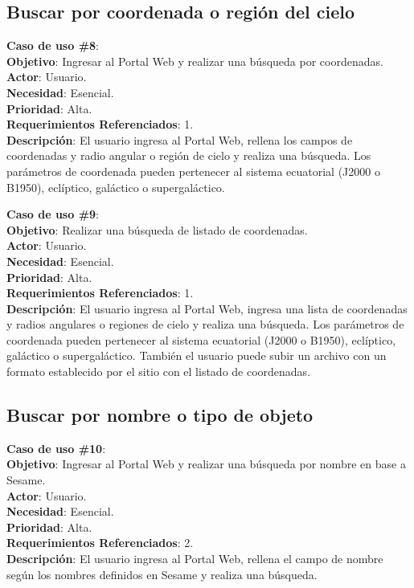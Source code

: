 \subsection{Buscar por coordenada o región del cielo}
\noindent\textbf{Caso de uso \#8}: \\
\textbf{Objetivo}: Ingresar al Portal Web y realizar una búsqueda por coordenadas. \\
\textbf{Actor}: Usuario. \\
\textbf{Necesidad}: Esencial. \\
\textbf{Prioridad}: Alta. \\
\textbf{Requerimientos Referenciados}: 1. \\
\textbf{Descripción}: El usuario ingresa al Portal Web, rellena los campos de coordenadas y radio angular o región de cielo y realiza una búsqueda. Los parámetros de coordenada pueden pertenecer al sistema ecuatorial (J2000 o B1950), eclíptico, galáctico o supergaláctico.
\vspace{1.0cm}

\noindent\textbf{Caso de uso \#9}: \\
\textbf{Objetivo}: Realizar una búsqueda de listado de coordenadas. \\
\textbf{Actor}: Usuario. \\
\textbf{Necesidad}: Esencial. \\
\textbf{Prioridad}: Alta. \\
\textbf{Requerimientos Referenciados}: 1. \\
\textbf{Descripción}: El usuario ingresa al Portal Web, ingresa una lista de coordenadas y radios angulares o regiones de cielo y realiza una búsqueda. Los parámetros de coordenada pueden pertenecer al sistema ecuatorial (J2000 o B1950), eclíptico, galáctico o supergaláctico. También el usuario puede subir un archivo con un formato establecido por el sitio con el listado de coordenadas.
\vspace{1.0cm}

\subsection{Buscar por nombre o tipo de objeto}
\textbf{Caso de uso \#10}: \\
\noindent\textbf{Objetivo}: Ingresar al Portal Web y realizar una búsqueda por nombre en base a Sesame. \\
\textbf{Actor}: Usuario.\\
\textbf{Necesidad}: Esencial.\\
\textbf{Prioridad}: Alta.\\
\textbf{Requerimientos Referenciados}: 2. \\
\textbf{Descripción}: El usuario ingresa al Portal Web, rellena el campo de nombre según los nombres definidos en Sesame y realiza una búsqueda.
\vspace{1.0cm}

